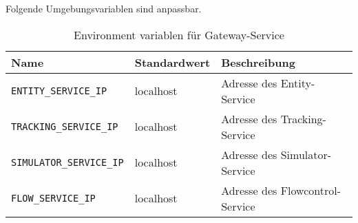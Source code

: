 Folgende Umgebungsvariablen sind anpassbar.

\begin{table}[h]
	\begin{tabular}{|l|l|l|}
		\hline
		Name & Standardwert & Beschreibung \\ \hline
		\verb|ENTITY_SERVICE_IP| & localhost & Adresse des Entity-Service \\ \hline
		\verb|TRACKING_SERVICE_IP| & localhost & Adresse des Tracking-Service \\ \hline
		\verb|SIMULATOR_SERVICE_IP| & localhost & Adresse des Simulator-Service \\ \hline
		\verb|FLOW_SERVICE_IP| & localhost & Adresse des Flowcontrol-Service \\ \hline
	\end{tabular}
	\caption{Environment variablen für Gateway-Service }
\end{table}

